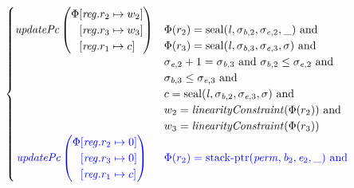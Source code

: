\documentclass[a3paper]{article}
\newcommand{\tand}{\text{ and }}
\newcommand{\sourcecolor}{\color{blue}}
\newcommand{\update}[2]{[#1 \mapsto #2]}
\newcommand{\updReg}[2]{\update{\reg.#1}{#2}}
\newcommand{\shareddom}[1]{\mathrm{#1}}
\newcommand{\perm}{\var{perm}}
\newcommand{\lin}{\var{l}}
\newcommand{\stkptr}[1]{\mathrm{stack\text{-}ptr}(#1)}
\newcommand{\seal}[1]{\shareddom{seal}(#1)}
\newcommand{\var}[1]{\mathit{#1}}
\newcommand{\reg}{\var{reg}}
\newcommand{\baddr}{\var{b}}
\newcommand{\eaddr}{\var{e}}
\newcommand{\plainfun}[2]{
  \ifthenelse{\equal{#2}{}}
  {\mathit{#1}}
  {\mathit{#1}(#2)}
}
\newcommand{\linCons}[1]{\plainfun{linearityConstraint}{#1}}
\newcommand{\updPcAddr}[1]{\plainfun{updatePc}{#1}}
\begin{document}
\begin{align*}
\begin{cases}
                                \updPcAddr{}\left(
                                \arraycolsep=0pt
                                \begin{array}{r l}
                                  \Phi&\updReg{r_2}{w_2}\\
                                      &\updReg{r_3}{w_3}\\
                                      &\updReg{r_1}{c}
                                \end{array}\right)
&
                                \arraycolsep=0pt
                                \begin{array}[t]{l}
                                  \Phi(r_2) = \seal{\lin,\sigma_{\baddr,2},\sigma_{\eaddr,2},\_} \tand \\
                                  \Phi(r_3) = \seal{\lin,\sigma_{\baddr,3},\sigma_{\eaddr,3},\sigma} \tand \\
                                  \sigma_{\eaddr,2}+1 = \sigma_{\baddr,3} \tand \sigma_{\baddr,2} \leq \sigma_{\eaddr,2} \tand\\
                                  \sigma_{\baddr,3} \leq \sigma_{\eaddr,3} \tand \\
                                  c = \seal{\lin,\sigma_{\baddr,2},\sigma_{\eaddr,3},\sigma} \tand \\
                                  w_2 = \linCons{\Phi(r_2)} \tand \\
                                  w_3 = \linCons{\Phi(r_3)} \\
                                \end{array}\\
                                \sourcecolor\left.
                                \updPcAddr{}\left(
                                \arraycolsep=0pt
                                \begin{array}{r l}
                                  \Phi&\updReg{r_2}{0}\\
                                      &\updReg{r_3}{0}\\
                                      &\updReg{r_1}{c}
                                \end{array}\right)\right.
&
                                \sourcecolor
                                \arraycolsep=0pt
                                \begin{array}[t]{l}
                                  \Phi(r_2) = \stkptr{\perm,\baddr_2,\eaddr_2,\_} \tand \\

\end{array}
\end{cases}
\end{align*}
\end{document}
